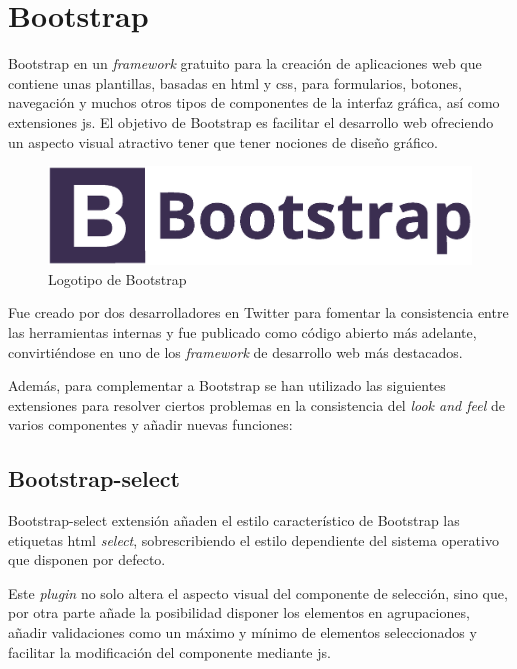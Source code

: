 \section{Bootstrap}

Bootstrap en un \textit{framework} gratuito para la creación de aplicaciones web que contiene unas plantillas, basadas en \acrshort{html} y \acrshort{css}, para formularios, botones, navegación y muchos otros tipos de componentes de la interfaz gráfica, así como extensiones \acrshort{js}. El objetivo de Bootstrap es facilitar el desarrollo web ofreciendo un aspecto visual atractivo tener que tener nociones de diseño gráfico.

\begin{figure}[!htbp]
	\centering
	\includegraphics[scale=0.45]{fig/bootstrap_logo}
	\caption{Logotipo de Bootstrap}
\end{figure}

Fue creado por dos desarrolladores en Twitter para fomentar la consistencia entre las herramientas internas y fue publicado como código abierto más adelante, convirtiéndose en uno de los \textit{framework} de desarrollo web más destacados.

Además, para complementar a Bootstrap se han utilizado las siguientes extensiones para resolver ciertos problemas en la consistencia del \textit{look and feel} de varios componentes y añadir nuevas funciones:

\subsection{Bootstrap-select}

Bootstrap-select\cite{BootstrapSelect} extensión añaden el estilo característico de Bootstrap las etiquetas \acrshort{html} \textit{select}, sobrescribiendo el estilo dependiente del sistema operativo que disponen por defecto. 

Este \textit{plugin} no solo altera el aspecto visual del componente de selección, sino que, por otra parte añade la posibilidad disponer los elementos en agrupaciones, añadir validaciones como un máximo y mínimo de elementos seleccionados y facilitar la modificación del componente mediante \acrshort{js}.

